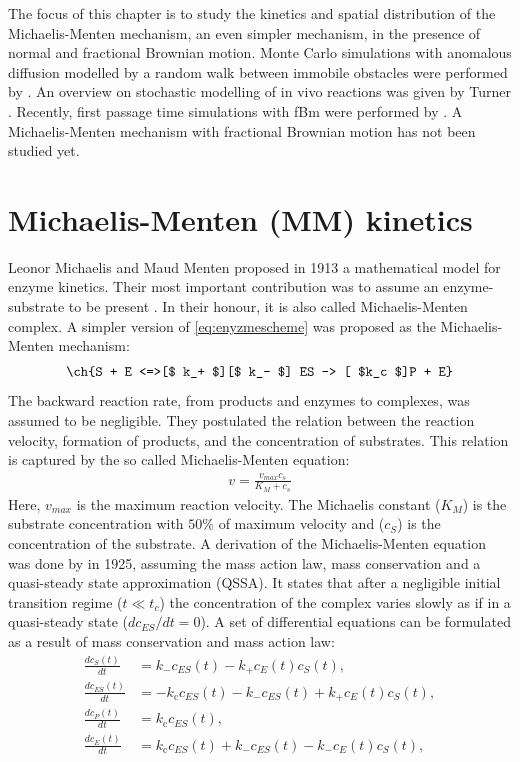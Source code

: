 \documentclass[
  a4paper,BCOR10mm,twoside,
  headsepline,footsepline,%
  fleqn,openbib
]{scrbook}
\begin{document}
The focus of this chapter is to study the kinetics and spatial distribution of the Michaelis-Menten mechanism, an even simpler mechanism, in the presence of normal and fractional Brownian motion. Monte Carlo simulations with anomalous diffusion modelled by a random walk between immobile obstacles were performed by \citet{Berry2002, Schnell2004}. An overview on stochastic modelling of in vivo reactions was given by Turner \cite{Turner2004}. Recently, first passage time simulations with fBm were performed by \citet{Jeon2014}. A Michaelis-Menten mechanism with fractional Brownian motion has not been studied yet.
\section{Michaelis-Menten (MM) kinetics}
Leonor Michaelis and Maud Menten  proposed in 1913 a mathematical model for enzyme kinetics. Their most important contribution was to assume an enzyme-substrate to be present \cite{michaelis1913kinetik}. In their honour, it is also called Michaelis-Menten complex. A simpler version of \cref{eq:enyzmescheme} was proposed as the Michaelis-Menten mechanism:
\begin{align} \label{eq:michaelismechanism}
\ch{S + E <=>[$ k_+ $][$ k_- $] ES -> [ $k_c $]P + E}
\end{align}
 The backward reaction rate, from products and enzymes to complexes, was assumed to be negligible. They postulated the relation between the reaction velocity, formation of products, and the concentration of substrates. This relation is captured by the so called Michaelis-Menten equation:
\begin{align} \label{michaelis-menten-equation}
 v=\frac{v_{max} c_s}{K_M+ c_s}
\end{align}
Here, $v_{max}$ is the maximum reaction velocity. The Michaelis constant ($K_M$) is the substrate concentration with $50 \%$ of maximum velocity and ($c_S$)  is the concentration of the substrate. A derivation of the Michaelis-Menten equation was done by \citet{Briggs1925} in 1925, assuming the mass action law, mass conservation and a quasi-steady state approximation (QSSA). It states that after a negligible initial transition regime ($t \ll t_c$) the concentration of the complex varies slowly as if in a quasi-steady state ($dc_{ES}/dt=0$). A set of differential equations can be formulated as a result of mass conservation and mass action law:
\begin{align}
\frac{dc_S(t)}{dt} &= k_{\mathrm{-}} c_{ES}(t)-k_{\mathrm{+}} c_E(t) c_S(t),\\
\frac{dc_{ES}(t)}{dt} &=  - k_{\mathrm{c}} c_{ES}(t) -k_{\mathrm{-}} c_{ES}(t)+k_{\mathrm{+}} c_E(t) c_S(t), \label{quasisteadymichaelis} \\
\frac{dc_P(t)}{dt} &= k_{\mathrm{c}} c_{ES}(t)  \label{first}, \\
\frac{dc_E(t)}{dt} &= k_{\mathrm{c}} c_{ES}(t)+k_{\mathrm{-}} c_{ES}(t)-k_{\mathrm{-}} c_E(t) c_S(t),
\end{align}
\end{document}
